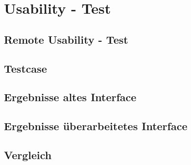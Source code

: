\chapter{Usability - Test}\label{ch:outlook}

\section{Remote Usability - Test}
\section{Testcase}
\section{Ergebnisse altes Interface}
\section{Ergebnisse überarbeitetes Interface}
\section{Vergleich}
